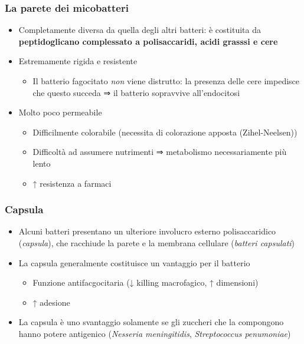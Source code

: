 \documentclass[italian,]{article}
\providecommand{\tightlist}{%
  \setlength{\itemsep}{0pt}\setlength{\parskip}{0pt}}
\begin{document}
\hypertarget{la-parete-dei-micobatteri}{%
\subsubsection{La parete dei
micobatteri}\label{la-parete-dei-micobatteri}}

\begin{itemize}
\tightlist
\item
  Completamente diversa da quella degli altri batteri: è costituita da
  \textbf{peptidoglicano complessato a polisaccaridi, acidi grasssi e
  cere}
\item
  Estremamente rigida e resistente

  \begin{itemize}
  \tightlist
  \item
    Il batterio fagocitato \emph{non} viene distrutto: la presenza delle
    cere impedisce che questo succeda ⇒ il batterio sopravvive
    all'endocitosi
  \end{itemize}
\item
  Molto poco permeabile

  \begin{itemize}
  \tightlist
  \item
    Difficilmente colorabile (necessita di colorazione apposta
    (Zihel-Neelsen))
  \item
    Difficoltà ad assumere nutrimenti ⇒ metabolismo necessariamente più
    lento
  \item
    ↑ resistenza a farmaci
  \end{itemize}
\end{itemize}

\hypertarget{capsula}{%
\subsubsection{Capsula}\label{capsula}}

\begin{itemize}
\tightlist
\item
  Alcuni batteri presentano un ulteriore involucro esterno
  polisaccaridico (\emph{capsula}), che racchiude la parete e la
  membrana cellulare (\emph{batteri capsulati})
\item
  La capsula generalmente costituisce un vantaggio per il batterio

  \begin{itemize}
  \tightlist
  \item
    Funzione antifacgocitaria (↓ killing macrofagico, ↑ dimensioni)
  \item
    ↑ adesione
  \end{itemize}
\item
  La capsula è uno svantaggio solamente se gli zuccheri che la
  compongono hanno potere antigenico (\emph{Nesseria meningitidis},
  \emph{Streptococcus penumoniae})
\end{itemize}
\end{document}
